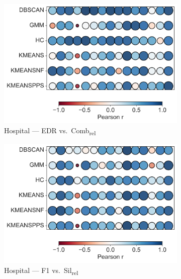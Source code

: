 \documentclass[10pt]{article} %
\numberwithin{equation}{section}
\begin{document}
\begin{enumerate}[label=(\alph*)]
\begin{figure}[H]
  \begin{subfigure}[b]{0.33\linewidth}
    \includegraphics[width=\linewidth]{figures/6.4.3graph/HO_EDR_vs_Comb_relative.pdf}
    \caption{Hospital — EDR vs.\ Comb\textsubscript{rel}}
    \label{fig:ho_edr_comb}
  \end{subfigure}\hfill
  \begin{subfigure}[b]{0.33\linewidth}
    \includegraphics[width=\linewidth]{figures/6.4.3graph/HO_F1_vs_Sil_relative.pdf}
    \caption{Hospital — F1 vs.\ Sil\textsubscript{rel}}
    \label{fig:ho_f1_sil}
  \end{subfigure}\hfill
  \begin{subfigure}[b]{0.33\linewidth}

\end{subfigure}
\end{figure}
\end{enumerate}
\end{document}
